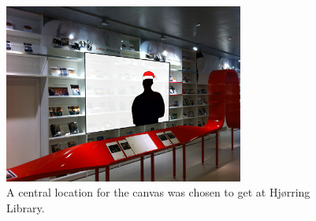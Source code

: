 



\begin{figure}[htbp]
\centering
\includegraphics[width=0.7\textwidth]{Pictures/HjoerringLibrary/LocationJohannesHat.jpg}
\caption{A central location for the canvas was chosen to get at Hj{\o}rring Library.}
\label{fig:concept_art}
\end{figure}

